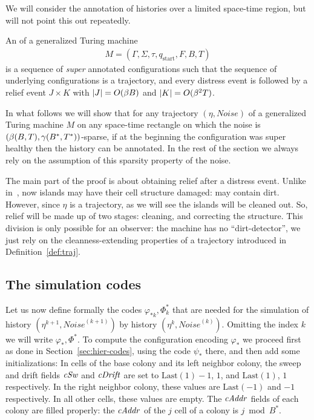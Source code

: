 \documentclass[12pt]{memoir}
\newcommand{\authnote}[3]
{\text{{ \textcolor{#3}{\( \langle\hspace{-0.2em}\langle \)\textsf{\footnotesize #1: #2}\( \rangle\hspace{-0.2em}\rangle \)}}}}
\newcommand{\authnote}[2]{}
\newcommand{\Pnote}[1]{{\authnote{P}{#1}{cyan}}}
\newcommand{\fld}[1]{\ensuremath{\textit{#1\/}}}
\def\B{B}
\newcommand{\Noise}{\mathit{Noise}}
\newcommand{\Tu}{T}
\newcommand{\cAddr}{\fld{cAddr}}
\newcommand{\cDrift}{\fld{cDrift}}
\newcommand{\cSweep}{\fld{cSw}}
\newcommand{\Last}{\mathrm{Last}}
\newcommand{\start}{\mathrm{start}}
\begin{document}
We will consider the annotation of histories over a limited space-time region, but will
not point this out repeatedly.

\begin{definition}\label{def:annotated-hist}
An  of a generalized Turing machine
    \begin{align*}
        M=(\Gamma,\Sigma,\tau,q_{\start},F,B,\Tu{})
     \end{align*}
is a sequence of \emph{super} annotated configurations such that
the sequence of underlying configurations is a trajectory, and 
every distress event is followed by a relief event \( J\times K \) with 
\( \abs{J}=O(\beta\B) \) and \( \abs{K}= O(\beta^{2}\Tu) \). %
\end{definition}

In what follows we will show that for any trajectory \( (\eta, \Noise) \) of a
generalized Turing machine \( M \) on any space-time rectangle on which the
noise is \( (\beta\pair{\B}{\Tu}, \gamma\pair{\B^{*}}{\Tu^{*}}) \)-sparse, if at the
beginning the configuration was super healthy then the history can be annotated.
In the rest of the section we always rely on the assumption of  this 
sparsity property of the noise.

The main part of the proof is about obtaining relief  after a distress event.
Unlike in~\cite{burstyTuring13}, now islands 
may have their cell structure damaged: may contain dirt.
However, since \( \eta \) is a trajectory, as we will see the islands will be cleaned out.
So, relief will be made up of two stages: cleaning, and correcting the structure.
This division is only possible for an observer: the machine has no
``dirt-detector'', we just rely on the cleanness-extending properties of a
trajectory introduced in Definition~\ref{def:traj}.


\subsection{The simulation codes}\label{sec:sim-codes}

Let us now define formally the codes \( \varphi_{*k},\Phi_{k}^{*} \) that are needed
for the simulation of history \( (\eta^{k+1},\Noise^{(k+1)}) \) by history \( (\eta^{k},\Noise^{(k)}) \).
Omitting the index \( k \) we will write \( \varphi_{*},\Phi^{*} \).
To compute the configuration encoding \( \varphi_{*} \) we proceed first as
done in Section~\ref{sec:hier-codes}, using the code \( \psi_{*} \) there,
and then add some initializations:
In cells of the base colony and its left neighbor  colony,
the sweep and drift fields \( \cSweep \) and \( \cDrift \) are set 
to \( \Last(1)-1 \),  \( 1 \), and \( \Last(1) \),  \( 1 \) respectively.
In the right neighbor colony, these values are \( \Last(-1) \) and \( -1 \) respectively.
In all other cells, these values are empty.
The \( \cAddr \) fields of each colony are filled properly:
the \( \cAddr \) of the \( j \) cell of a colony
is \( j \bmod \B^{*} \). \Pnote{Picture?}
\end{document}
